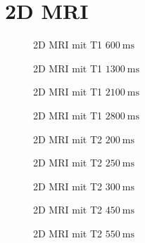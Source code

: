 \section{2D MRI}
\begin{figure}[H]
    \centering
    
    \caption{2D MRI mit T1 $\SI{600}{\milli\second}$}
\end{figure}

\begin{figure}[H]
    \centering
    
    \caption{2D MRI mit T1 $\SI{1300}{\milli\second}$}
\end{figure}
\begin{figure}[H]
    \centering
    
    \caption{2D MRI mit T1 $\SI{2100}{\milli\second}$}
\end{figure}
\begin{figure}[H]
    \centering
    
    \caption{2D MRI mit T1 $\SI{2800}{\milli\second}$}
\end{figure}

\begin{figure}[H]
    \centering
    
    \caption{2D MRI mit T2 $\SI{200}{\milli\second}$}
\end{figure}
\begin{figure}[H]
    \centering
    
    \caption{2D MRI mit T2 $\SI{250}{\milli\second}$}
\end{figure}
\begin{figure}[H]
    \centering
    
    \caption{2D MRI mit T2 $\SI{300}{\milli\second}$}
\end{figure}
\begin{figure}[H]
    \centering
    
    \caption{2D MRI mit T2 $\SI{450}{\milli\second}$}
\end{figure}
\begin{figure}[H]
    \centering
    
    \caption{2D MRI mit T2 $\SI{550}{\milli\second}$}
\end{figure}